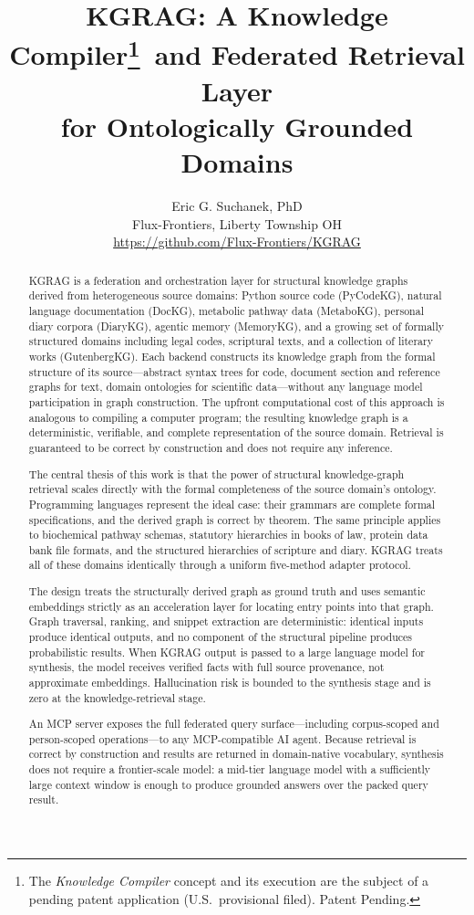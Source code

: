 \documentclass[10pt]{article}
\title{KGRAG: A Knowledge Compiler\thanks{The \emph{Knowledge Compiler}
concept and its execution are the subject of a pending patent application
(U.S.\ provisional filed). Patent Pending. }\ and Federated Retrieval Layer\\
for Ontologically Grounded Domains}
\author{Eric G. Suchanek, PhD\\
Flux-Frontiers, Liberty Township OH\\[4pt]
\small\url{https://github.com/Flux-Frontiers/KGRAG}}
\date{}
\begin{document}
\maketitle

\begin{abstract}
KGRAG is a federation and orchestration layer for structural knowledge graphs
derived from heterogeneous source domains: Python source code (PyCodeKG), natural
language documentation (DocKG), metabolic pathway data (MetaboKG), personal diary
corpora (DiaryKG), agentic memory (MemoryKG), and a growing set of formally structured
domains including legal codes, scriptural texts, and a collection of literary works
(GutenbergKG). Each backend constructs its knowledge graph from the formal structure
of its source---abstract syntax trees for code, document section and reference graphs
for text, domain ontologies for scientific data---without any language model
participation in graph construction. The upfront computational cost of this approach
is analogous to compiling a computer program; the resulting knowledge graph is a
deterministic, verifiable, and complete representation of the source domain.
Retrieval is guaranteed to be correct by construction and does not require any inference.

The central thesis of this work is that the power of structural knowledge-graph
retrieval scales directly with the formal completeness of the source domain's
ontology. Programming languages represent the ideal case: their grammars are
complete formal specifications, and the derived graph is correct by
theorem. The same principle applies to biochemical pathway schemas, statutory
hierarchies in books of law, protein data bank file formats, and the structured
hierarchies of scripture and diary. KGRAG treats all of these domains
identically through a uniform five-method adapter protocol.

The design treats the structurally derived graph as ground truth and uses
semantic embeddings strictly as an acceleration layer for locating entry points
into that graph. Graph traversal, ranking, and snippet extraction are
deterministic: identical inputs produce identical outputs, and no component of
the structural pipeline produces probabilistic results. When KGRAG output is
passed to a large language model for synthesis, the model receives verified
facts with full source provenance, not approximate embeddings. Hallucination
risk is bounded to the synthesis stage and is zero at the knowledge-retrieval
stage.

An MCP server exposes the full federated query surface---including corpus-scoped
and person-scoped operations---to any MCP-compatible AI agent. Because retrieval
is correct by construction and results are returned in domain-native vocabulary,
synthesis does not require a frontier-scale model: a mid-tier language model
with a sufficiently large context window is enough to produce grounded answers
over the packed query result.
\end{abstract}
\end{document}
